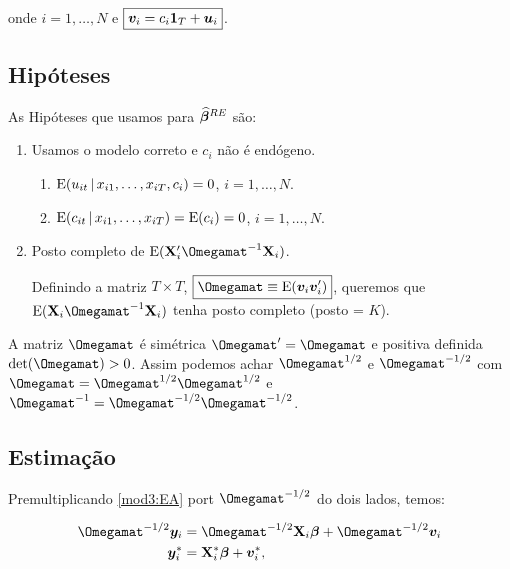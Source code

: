 \documentclass[11pt, oneside, a4paper, article]{article}
\numberwithin{equation}{section}
\begin{document}
\begin{description}
\noindent
onde
$i = 1, \dots, N$ e $\boxed{\boldsymbol{v}_{i} = c_{i} \boldsymbol{1}_{T} + \boldsymbol{u}_{i}}$.

\subsection{Hipóteses}

As Hipóteses que usamos para $\boldsymbol{\widehat{\beta}}^{RE}$ são:

\begin{enumerate} \itemsep0pt
\item  
Usamos o modelo correto e $c_{i}$ não é endógeno.

\begin{enumerate}[label =\alph*)]
\item 
$\text{E}( u_{it} \, | \,  x_{i1}, \dots, x_{iT}, c_{i} ) = 0$,
$i = 1, \dots, N$.
\item        
$\text{E}( c_{it} \, | \, x_{i1}, \dots, x_{iT} ) = \text{E}( c_{i} ) = 0$,
$i = 1, \dots, N$.
\end{enumerate}

\item  Posto completo de $\E( \Xmat_{i}' \Omegamat^{-1} \Xmat_{i} )$.

Definindo a matriz $T \times T$, $\boxed{\Omegamat \equiv \E(\mbs{v}_{i} \mbs{v}_{i}')}$, queremos que $\E( \Xmat_{i} \Omegamat^{-1} \Xmat_{i} )$ tenha posto completo (posto = $K$).
\end{enumerate}

A matriz $\Omegamat$ é simétrica $\Omegamat' = \Omegamat$ e positiva definida $\det(\Omegamat) > 0$.
Assim podemos achar $\Omegamat^{1/2}$ e $\Omegamat^{-1/2}$ com $\Omegamat = \Omegamat^{1/2} \Omegamat^{1/2}$ e $\Omegamat^{-1} = \Omegamat^{-1/2} \Omegamat^{-1/2}$.

\subsection{Estimação}

Premultiplicando \eqref{mod3:EA} port $\Omegamat^{-1/2}$ do dois lados, temos:

\vspace{-1 em}
\begin{align} 
\notag
\Omegamat^{-1/2}\yvec_{i} &= \Omegamat^{-1/2}\Xmat_{i} \betavec + \Omegamat^{-1/2}\mbs{v}_{i}
\\
\label{mod4:EA}
\yvec_{i}^{*} &= \Xmat_{i}^{*} \betavec + \mbs{v}_{i}^{*},
\end{align}


\end{description}
\end{document}
